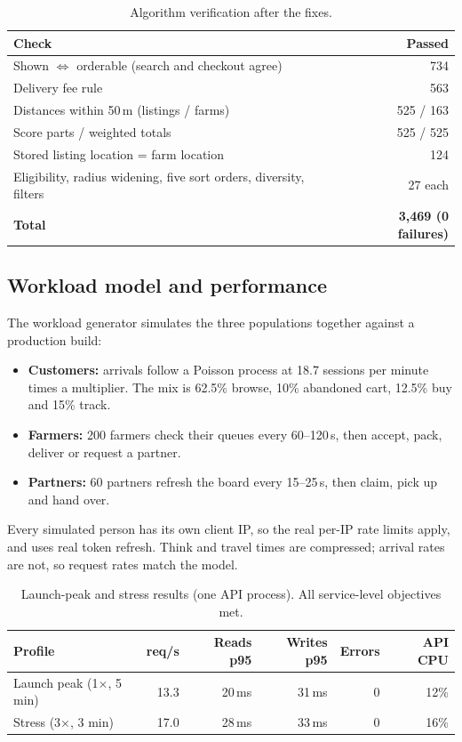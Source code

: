 \documentclass[11pt,a4paper]{article}
\begin{document}
\begin{table}[H]\centering\small
\begin{tabular}{@{}lr@{}}
\toprule
\textbf{Check} & \textbf{Passed} \\
\midrule
Shown $\Leftrightarrow$ orderable (search and checkout agree) & 734 \\
Delivery fee rule & 563 \\
Distances within 50\,m (listings / farms) & 525 / 163 \\
Score parts / weighted totals & 525 / 525 \\
Stored listing location = farm location & 124 \\
Eligibility, radius widening, five sort orders, diversity, filters & 27 each \\
\midrule
\textbf{Total} & \textbf{3{,}469 (0 failures)} \\
\bottomrule
\end{tabular}
\caption{Algorithm verification after the fixes.}
\end{table}

\subsection{Workload model and performance}

The workload generator simulates the three populations together against a production build:
\begin{itemize}
  \item \textbf{Customers:} arrivals follow a Poisson process at 18.7 sessions per minute times a multiplier. The mix is 62.5\% browse, 10\% abandoned cart, 12.5\% buy and 15\% track.
  \item \textbf{Farmers:} 200 farmers check their queues every 60--120\,s, then accept, pack, deliver or request a partner.
  \item \textbf{Partners:} 60 partners refresh the board every 15--25\,s, then claim, pick up and hand over.
\end{itemize}
Every simulated person has its own client IP, so the real per-IP rate limits apply, and uses real token refresh. Think and travel times are compressed; arrival rates are not, so request rates match the model.

\begin{table}[H]\centering\small
\begin{tabular}{@{}lrrrrr@{}}
\toprule
\textbf{Profile} & \textbf{req/s} & \textbf{Reads p95} & \textbf{Writes p95} & \textbf{Errors} & \textbf{API CPU} \\
\midrule
Launch peak (1$\times$, 5 min) & 13.3 & 20\,ms & 31\,ms & 0 & 12\% \\
Stress (3$\times$, 3 min) & 17.0 & 28\,ms & 33\,ms & 0 & 16\% \\
\bottomrule
\end{tabular}
\caption{Launch-peak and stress results (one API process). All service-level objectives met.}
\end{table}
\end{document}
